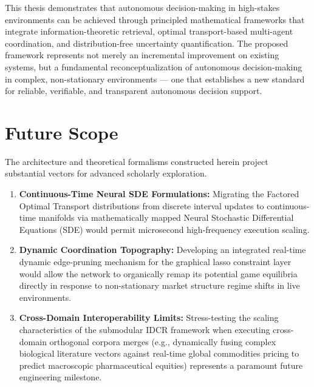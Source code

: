 \documentclass[12pt,a4paper,oneside]{report}
\theoremstyle{definition}
\theoremstyle{remark}
\begin{document}
This thesis demonstrates that autonomous decision-making in high-stakes environments can be achieved through principled mathematical frameworks that integrate information-theoretic retrieval, optimal transport-based multi-agent coordination, and distribution-free uncertainty quantification. The proposed framework represents not merely an incremental improvement on existing systems, but a fundamental reconceptualization of autonomous decision-making in complex, non-stationary environments --- one that establishes a new standard for reliable, verifiable, and transparent autonomous decision support.

\chapter{Future Scope}

The architecture and theoretical formalisms constructed herein project substantial vectors for advanced scholarly exploration.
\begin{enumerate}
    \item \textbf{Continuous-Time Neural SDE Formulations:} Migrating the Factored Optimal Transport distributions from discrete interval updates to continuous-time manifolds via mathematically mapped Neural Stochastic Differential Equations (SDE) would permit microsecond high-frequency execution scaling.
    \item \textbf{Dynamic Coordination Topography:} Developing an integrated real-time dynamic edge-pruning mechanism for the graphical lasso constraint layer would allow the network to organically remap its potential game equilibria directly in response to non-stationary market structure regime shifts in live environments.
    \item \textbf{Cross-Domain Interoperability Limits:} Stress-testing the scaling characteristics of the submodular IDCR framework when executing cross-domain orthogonal corpora merges (e.g., dynamically fusing complex biological literature vectors against real-time global commodities pricing to predict macroscopic pharmaceutical equities) represents a paramount future engineering milestone.
\end{enumerate}

\renewcommand{\bibname}{References}
\nocite{*}


\end{document}

